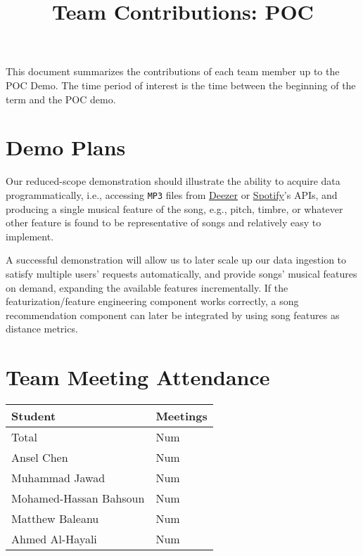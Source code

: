 \documentclass{article}
\title{Team Contributions: POC\\\progname}
\author{\authname}
\date{}
\begin{document}
\maketitle

This document summarizes the contributions of each team member up to the POC
Demo.  The time period of interest is the time between the beginning of the term
and the POC demo.

\section{Demo Plans}

\begin{description}[leftmargin=0cm]
    \item[Demonstration] Our reduced-scope demonstration should illustrate the ability to acquire data programmatically, i.e., accessing \texttt{MP3} files from \href{https://developers.deezer.com/api}{Deezer} or \href{https://developer.spotify.com/documentation/web-api}{Spotify}'s APIs, and producing a single musical feature of the song, e.g., pitch, timbre, or whatever other feature is found to be representative of songs and relatively easy to implement.
    \item[Post-demonstration] A successful demonstration will allow us to later scale up our data ingestion to satisfy multiple users' requests automatically, and provide songs' musical features on demand, expanding the available features incrementally. If the featurization/feature engineering component works correctly, a song recommendation component can later be integrated by using song features as distance metrics.
\end{description}

\section{Team Meeting Attendance}


\begin{table}[H]
\centering
\begin{tabular}{ll}
\toprule
\textbf{Student} & \textbf{Meetings}\\
\midrule
Total & Num\\
Ansel Chen & Num\\
Muhammad Jawad & Num\\
Mohamed-Hassan Bahsoun & Num\\
Matthew Baleanu & Num\\
Ahmed Al-Hayali & Num\\
\bottomrule
\end{tabular}
\end{table}
\end{document}
